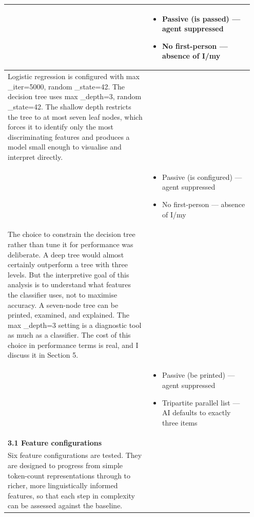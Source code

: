 \documentclass[11pt]{article}
\begin{document}
\begin{longtable}{|p{0.55\linewidth}|p{0.40\linewidth}|}
\hline
\rule[-3.5cm]{0pt}{3.5cm} & \begin{itemize}[leftmargin=1em,itemsep=1pt,topsep=1pt,parsep=0pt]
  \item Passive (is passed) --- agent suppressed
  \item No first-person --- absence of I/my
\end{itemize} \\
\hline
Logistic regression is configured with max \_iter=5000, random \_state=42. The decision tree uses max \_depth=3, random \_state=42. The shallow depth restricts the tree to at most seven leaf nodes, which forces it to identify only the most discriminating features and produces a model small enough to visualise and interpret directly. & \\[2pt]
\hline
\rule[-3.5cm]{0pt}{3.5cm} & \begin{itemize}[leftmargin=1em,itemsep=1pt,topsep=1pt,parsep=0pt]
  \item Passive (is configured) --- agent suppressed
  \item No first-person --- absence of I/my
\end{itemize} \\
\hline
The choice to constrain the decision tree rather than tune it for performance was deliberate. A deep tree would almost certainly outperform a tree with three levels. But the interpretive goal of this analysis is to understand what features the classifier uses, not to maximise accuracy. A seven-node tree can be printed, examined, and explained. The max \_depth=3 setting is a diagnostic tool as much as a classifier. The cost of this choice in performance terms is real, and I discuss it in Section 5. & \\[2pt]
\hline
\rule[-3.5cm]{0pt}{3.5cm} & \begin{itemize}[leftmargin=1em,itemsep=1pt,topsep=1pt,parsep=0pt]
  \item Passive (be printed) --- agent suppressed
  \item Tripartite parallel list --- AI defaults to exactly three items
\end{itemize} \\
\hline
\textbf{3.1 Feature configurations}\\[4pt]
Six feature configurations are tested. They are designed to progress from simple token-count representations through to richer, more linguistically informed features, so that each step in complexity can be assessed against the baseline. & \\[2pt]
\hline

\end{longtable}
\end{document}
